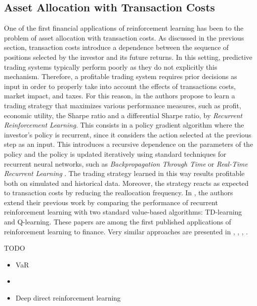 \subsection{Asset Allocation with Transaction Costs}
One of the first financial applications of reinforcement learning has been to the problem of asset allocation with transaction costs. As discussed in the previous section, transaction costs introduce a dependence between the sequence of positions selected by the investor and its future returns. In this setting, predictive trading systems typically perform poorly as they do not explicitly this mechanism. Therefore, a profitable trading system requires prior decisions as input in order to properly take into account the effects of transactions costs, market impact, and taxes. For this reason, in \cite{moody1997optimization} the authors propose to learn a trading strategy that maximizes various performance measures, such as profit, economic utility, the Sharpe ratio and a differential Sharpe ratio, by \emph{Recurrent Reinforcement Learning}. This consists in a policy gradient algorithm where the investor's policy is recurrent, since it considers the action selected at the previous step as an input. This introduces a recursive dependence on the parameters of the policy and the policy is updated iteratively using standard techniques for recurrent neural networks, such as \emph{Backpropagation Through Time} \cite{werbos1990backpropagation} or \emph{Real-Time Recurrent Learning} \cite{williams1989learning}. The trading strategy learned in this way results profitable both on simulated and historical data. Moreover, the strategy reacts as expected to transaction costs by reducing the reallocation frequency. In \cite{moody2001learning}, the authors extend their previous work by comparing the performance of recurrent reinforcement learning with two standard value-based algorithms: TD-learning and Q-learning. These papers are among the first published applications of reinforcement learning to finance. Very similar approaches are presented in \cite{choey1997nonlineareltit}, \cite{gold2003FX}, \cite{casqueiro2006neuro}, \cite{dempster2006automated}. 

TODO
\begin{itemize}
\item \cite{chapados2001cost} VaR
\item \cite{bekiros2010heterogeneouseltit} 
\item \cite{deng2016deep} Deep direct reinforcement learning

\end{itemize}




